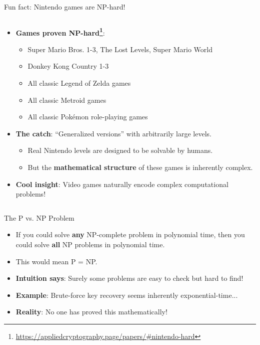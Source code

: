\documentclass[aspectratio=169, lualatex, handout]{beamer}
\begin{document}
\begin{frame}{Fun fact: Nintendo games are NP-hard!}
	\begin{columns}[c]
		\begin{column}{1\textwidth}
			\begin{itemize}[<+->]
				\item \textbf{Games proven NP-hard\footnote{\url{https://appliedcryptography.page/papers/\#nintendo-hard}}}:
				      \begin{itemize}
					      \item Super Mario Bros. 1-3, The Lost Levels, Super Mario World
					      \item Donkey Kong Country 1-3
					      \item All classic Legend of Zelda games
					      \item All classic Metroid games
					      \item All classic Pokémon role-playing games
				      \end{itemize}
				\item \textbf{The catch}: ``Generalized versions'' with arbitrarily large levels.
				      \begin{itemize}
					      \item Real Nintendo levels are designed to be solvable by humans.
					      \item But the \textbf{mathematical structure} of these games is inherently complex.
				      \end{itemize}
				\item \textbf{Cool insight}: Video games naturally encode complex computational problems!
			\end{itemize}
		\end{column}
	\end{columns}
\end{frame}

\begin{frame}{The P vs. NP Problem}
	\begin{itemize}[<+->]
		\item If you could solve \textbf{any} NP-complete problem in polynomial time, then you could solve \textbf{all} NP problems in polynomial time.
		\item This would mean P = NP.
		\item \textbf{Intuition says}: Surely some problems are easy to check but hard to find!
		\item \textbf{Example}: Brute-force key recovery seems inherently exponential-time...
		\item \textbf{Reality}: No one has proved this mathematically!
	\end{itemize}
\end{frame}
\end{document}
